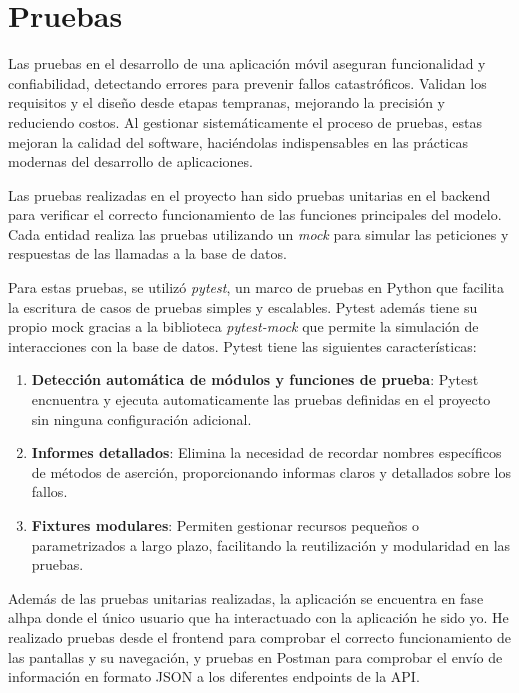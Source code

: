 \chapter{Pruebas}

Las pruebas en el desarrollo de una aplicación móvil aseguran funcionalidad y confiabilidad, detectando errores para prevenir fallos catastróficos. Validan los requisitos y el diseño desde etapas tempranas, mejorando la precisión y reduciendo costos. Al gestionar sistemáticamente el proceso de pruebas, estas mejoran la calidad del software, haciéndolas indispensables en las prácticas modernas del desarrollo de aplicaciones.\cite{zhu}

Las pruebas realizadas en el proyecto han sido pruebas unitarias en el backend para verificar el correcto funcionamiento de las funciones principales del modelo. Cada entidad realiza las pruebas utilizando un \textit{mock} para simular las peticiones y respuestas de las llamadas a la base de datos.

Para estas pruebas, se utilizó \textit{pytest}, un marco de pruebas en Python que facilita la escritura de casos de pruebas simples y escalables. Pytest además tiene su propio mock gracias a la biblioteca \textit{pytest-mock} que permite la simulación de interacciones con la base de datos. Pytest tiene las siguientes características:

\begin{enumerate}
    \item \textbf{Detección automática de módulos y funciones de prueba}: Pytest encnuentra y ejecuta automaticamente las pruebas definidas en el proyecto sin ninguna configuración adicional.
    \item \textbf{Informes detallados}: Elimina la necesidad de recordar nombres específicos de métodos de aserción, proporcionando informas claros y detallados sobre los fallos.
    \item \textbf{Fixtures modulares}: Permiten gestionar recursos pequeños o parametrizados a largo plazo, facilitando la reutilización y modularidad en las pruebas.
\end{enumerate}

Además de las pruebas unitarias realizadas, la aplicación se encuentra en fase alhpa donde el único usuario que ha interactuado con la aplicación he sido yo. He realizado pruebas desde el frontend para comprobar el correcto funcionamiento de las pantallas y su navegación, y pruebas en Postman para comprobar el envío de información en formato JSON a los diferentes endpoints de la API.